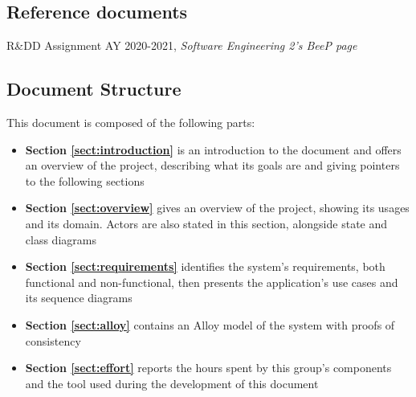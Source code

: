 \subsection{Reference documents}
R\&DD Assignment AY 2020-2021, \textit{Software Engineering 2's BeeP page}

\subsection{Document Structure}
This document is composed of the following parts:
\begin{itemize}[itemsep=-1mm, topsep=-1mm]
	\item \textbf{Section \ref{sect:introduction}} is an introduction to the document and offers an overview of the project, describing what its goals are and giving pointers to the following sections
	\item \textbf{Section \ref{sect:overview}} gives an overview of the project, showing its usages and its domain. Actors are also stated in this section, alongside state and class diagrams
	\item \textbf{Section \ref{sect:requirements}} identifies the system's requirements, both functional and non-functional, then presents the application's use cases and its sequence diagrams
	\item \textbf{Section \ref{sect:alloy}} contains an Alloy model of the system with proofs of consistency
	\item \textbf{Section \ref{sect:effort}} reports the hours spent by this group's components and the tool used during the development of this document 
\end{itemize}